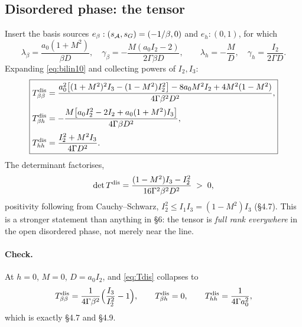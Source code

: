 \subsection{Disordered phase: the tensor}
Insert the basis sources $e_\beta:(s_{\mathcal{A}},s_G)=(-1/\beta,0)$ and $e_h:(0,1)$, for which
\begin{equation}
  \lambda_\beta=\frac{a_0(1+M^{2})}{\beta D},\quad
  \gamma_\beta=-\frac{M(a_0I_2-2)}{2\Gamma\beta D},\qquad
  \lambda_h=-\frac{M}{D},\quad
  \gamma_h=\frac{I_2}{2\Gamma D} .
\end{equation}
Expanding \eqref{eq:bilin10} and collecting powers of $I_2,I_3$:
\begin{equation}
  \boxed{
  \begin{aligned}
  T^{\rm dis}_{\beta\beta}&=\frac{a_0^{2}\big[(1+M^{2})^{2}I_3-(1-M^{2})I_2^{2}\big]
    -8a_0M^{2}I_2+4M^{2}(1-M^{2})}{4\Gamma\beta^{2}D^{2}},\\[2pt]
  T^{\rm dis}_{\beta h}&=-\frac{M\big[a_0I_2^{2}-2I_2+a_0(1+M^{2})I_3\big]}{4\Gamma\beta D^{2}},\\[2pt]
  T^{\rm dis}_{hh}&=\frac{I_2^{2}+M^{2}I_3}{4\Gamma D^{2}} .
  \end{aligned}}
  \label{eq:Tdis}
\end{equation}
The determinant factorises,
\begin{equation}
  \det T^{\rm dis}=\frac{(1-M^{2})I_3-I_2^{2}}{16\Gamma^{2}\beta^{2}D^{2}}\;>\;0 ,
  \label{eq:detdis}
\end{equation}
positivity following from Cauchy--Schwarz, $I_2^{2}\le I_1I_3=(1-M^{2})I_3$ (\S4.7). This is a
stronger statement than anything in \S6: the tensor is \emph{full rank everywhere} in the open
disordered phase, not merely near the line.

\paragraph{Check.} At $h=0$, $M=0$, $D=a_0I_2$, and \eqref{eq:Tdis} collapses to
\begin{equation}
  T^{\rm dis}_{\beta\beta}=\frac{1}{4\Gamma\beta^{2}}\Big(\frac{I_3}{I_2^{2}}-1\Big),
  \qquad T^{\rm dis}_{\beta h}=0,\qquad T^{\rm dis}_{hh}=\frac{1}{4\Gamma a_0^{2}} ,
\end{equation}
which is exactly \S4.7 and \S4.9. \checkmark

